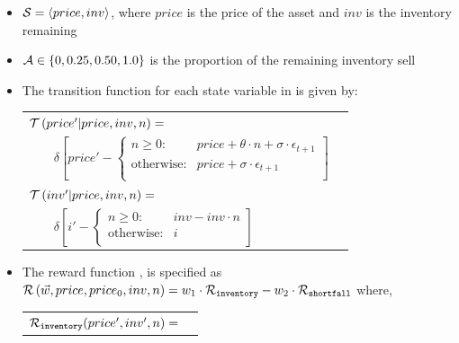\begin{itemize}
    \item {\footnotesize $ \mathcal{S} = \left\langle price, inv \right\rangle$}, where $ price $ is the price of the asset and $ inv $ is the inventory remaining 
    \item {\footnotesize $ \mathcal{A} \in \left\lbrace 0, 0.25, 0.50, 1.0 \right\rbrace $} is the proportion of the remaining inventory sell
    \item The transition function {\footnotesize \Transition} for each state variable in {\footnotesize \State} is given by:    \\
    {\footnotesize 
        \abovedisplayskip=5pt
        \belowdisplayskip=0pt
        \renewcommand{\arraystretch}{1.5}
        \begin{tabular}{ll}
            $ \mathcal{T}\left( price' | price, inv, n \right) = $ & $ $ \\
                $ \qquad \delta \left[ price' - \begin{cases}
                n \geq 0  : & price + \theta \cdot n + \sigma \cdot \epsilon_{t+1} \\
                \text{otherwise} : & price + \sigma \cdot \epsilon_{t+1} \\
                \end{cases} \right] $ & $ $\\            
            $ \mathcal{T}\left( inv' | price, inv, n \right) = $ & $ $ \\
                $ \qquad \delta \left[ i' - \begin{cases}
                n \geq 0 : & inv - inv \cdot n \\
                \text{otherwise} : & i \\
                \end{cases} \right] $ & $ $\\
        \end{tabular}
    }%
    \item The reward function {\footnotesize \Reward}, is specified as {\footnotesize $ \mathcal{R}\left(\vec{w}, price, price_0, inv, n \right) = w_1 \cdot \mathcal{R}_{\mathtt{inventory}} - w_2 \cdot \mathcal{R}_{\mathtt{shortfall}} $} where, \\
    {\footnotesize 
        \abovedisplayskip=10pt
        \belowdisplayskip=0pt
        \renewcommand{\arraystretch}{1.5}
        \begin{tabular}{ll}    
            $ \mathcal{R}_{\mathtt{inventory}}(price', inv', n) = $ &  $ $ \\

\end{tabular}}
\end{itemize}
